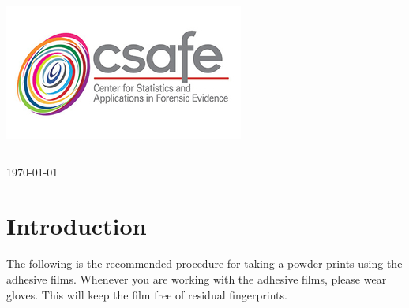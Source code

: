 \begin{titlepage}
\includegraphics[scale=.5]{Logo}\\[1cm]

\begin{center}
\begin{tabular}{ c   |   c } 
 
\end{tabular}
\end{center}


{\large \today}\\[2cm] %


 

\vfill %

\end{titlepage}




\section{Introduction}

The following is the recommended procedure for taking a powder prints using the adhesive films. Whenever you are working with the adhesive films, please wear gloves. This will keep the film free of residual fingerprints. 

